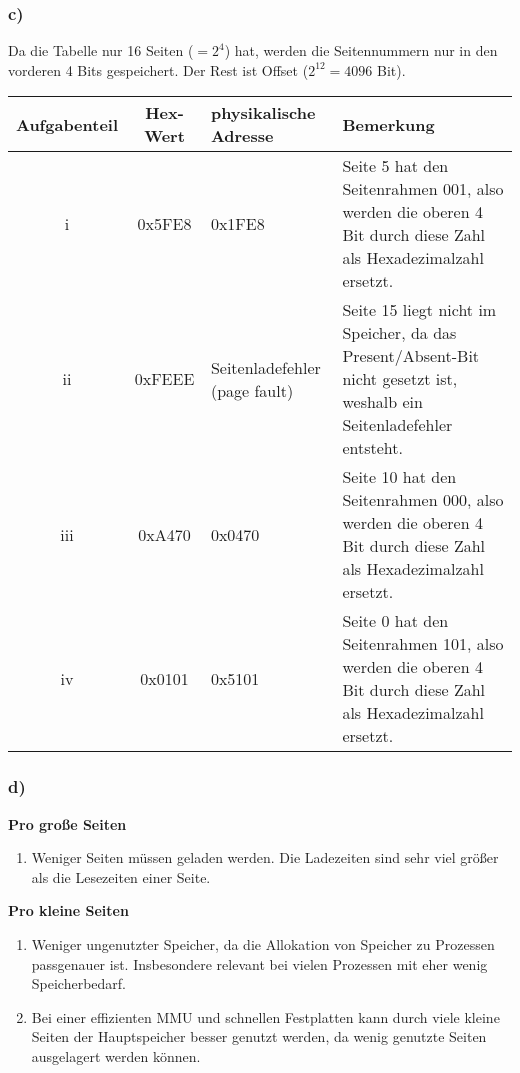 \documentclass{article}
\begin{document}
\subsubsection*{c)}
Da die Tabelle nur 16 Seiten ($=2^4$) hat, werden die Seitennummern nur in den vorderen 4 Bits gespeichert.
Der Rest ist Offset ($2^{12} = 4096$ Bit). \\
\begin{tabular}{||c|c|p{}||p{}||}\hline
	\textbf{Aufgabenteil}	&	\textbf{Hex-Wert}	&	\textbf{physikalische} \textbf{Adresse}	&	\textbf{Bemerkung}	\\ \hline
	i	&	0x5FE8	&	0x1FE8	&	Seite 5 hat den Seitenrahmen 001, also werden die oberen 4 Bit durch diese Zahl als Hexadezimalzahl ersetzt.\\\hline
	ii	&	0xFEEE	&	Seitenladefehler (page fault)	&	Seite 15 liegt nicht im Speicher, da das Present/Absent-Bit nicht gesetzt ist, weshalb ein Seitenladefehler entsteht.\\\hline
	iii	&	0xA470	&	0x0470	&	Seite 10 hat den Seitenrahmen 000, also werden die oberen 4 Bit durch diese Zahl als Hexadezimalzahl ersetzt.\\\hline
	iv	&	0x0101	&	0x5101	&	Seite 0 hat den Seitenrahmen 101, also werden die oberen 4 Bit durch diese Zahl als Hexadezimalzahl ersetzt.\\\hline
\end{tabular}
\subsubsection*{d)}
\begin{minipage}[t]{.47\textwidth}
	\hspace{.3cm}\textbf{Pro große Seiten}\\
	\begin{center}\begin{enumerate}
		\item Weniger Seiten müssen geladen werden.
		Die Ladezeiten sind sehr viel größer als die Lesezeiten einer Seite.
	\end{enumerate}\end{center}
\end{minipage}
\begin{minipage}[t]{.47\textwidth}
	\hspace{.3cm}\textbf{Pro kleine Seiten}\\
	\begin{center}\begin{enumerate}
		\item Weniger ungenutzter Speicher, da die Allokation von Speicher zu Prozessen passgenauer ist.
		Insbesondere relevant bei vielen Prozessen mit eher wenig Speicherbedarf.
		\item Bei einer effizienten MMU und schnellen Festplatten kann durch viele kleine Seiten der Hauptspeicher besser genutzt werden, da wenig genutzte Seiten ausgelagert werden können.
	\end{enumerate}\end{center}
\end{minipage}
\end{document}
